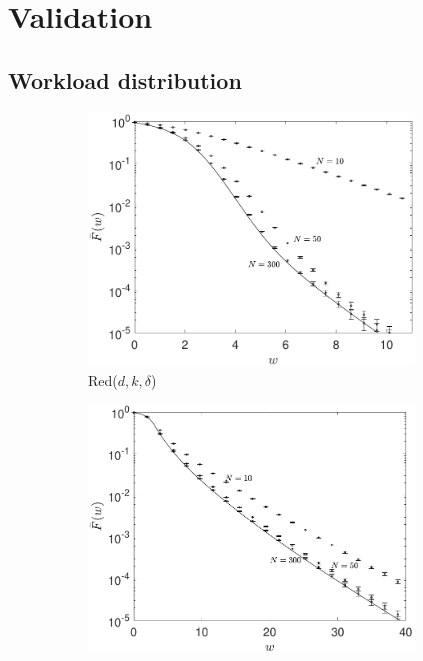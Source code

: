 \documentclass[12pt]{report}
\begin{document}
\section{Validation} \label{sec:validation_WL}
\subsection{Workload distribution} \label{App:val_WL}

\begin{figure}[t]
\begin{subfigure}{.49\textwidth}
\centering
\includegraphics[width=0.95\textwidth]{figures/Chapter4/WL_simul_Reddk.pdf}
\caption{Red($d,k,\delta$)}
\label{fig:num_accuracy_Reddk}
\end{subfigure}
\begin{subfigure}{.49\textwidth}
\centering
\includegraphics[width=0.95\textwidth]{figures/Chapter4/WL_simul_RTQ.pdf}

\end{subfigure}
\end{figure}
\end{document}
